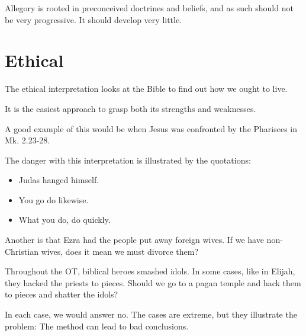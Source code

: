\documentclass{beamer}
\begin{document}
\begin{frame}
  Allegory is rooted in preconceived doctrines and beliefs, and as such should not be very progressive.
  It should develop very little.
\end{frame}

\section{Ethical}

\begin{frame}
  The ethical interpretation looks at the Bible to find out how we ought to live.
\end{frame}

\begin{frame}
  It is the easiest approach to grasp both its strengths and weaknesses.
\end{frame}

\begin{frame}
  A good example of this would be when Jesus was confronted by the Pharisees in Mk. 2.23-28.
\end{frame}

\begin{frame}
  The danger with this interpretation is illustrated by the quotations:
  \begin{itemize}
	\item Judas hanged himself.
	\item You go do likewise.
	\item What you do, do quickly.
  \end{itemize}
\end{frame}

\begin{frame}
  Another is that Ezra had the people put away foreign wives.
  If we have non-Christian wives, does it mean we must divorce them?
\end{frame}

\begin{frame}
  Throughout the OT, biblical heroes smashed idols.
  In some cases, like in Elijah, they hacked the priests to pieces.
  Should we go to a pagan temple and hack them to pieces and shatter the idols?
\end{frame}

\begin{frame}
  In each case, we would answer no. The cases are extreme, but they illustrate the problem:
  The method can lead to bad conclusions.
\end{frame}
\end{document}
